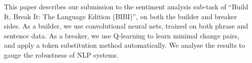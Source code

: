 This paper describes our submission to the sentiment analysis sub-task of ``Build It, Break It: The Language Edition (BIBI)'', on both the builder and breaker sides. As a builder, we use convolutional neural nets, trained on both phrase and sentence data. As a breaker, we use Q-learning to learn minimal change pairs, and apply a token substitution method automatically. We analyse the results to gauge the robustness of NLP systems.
